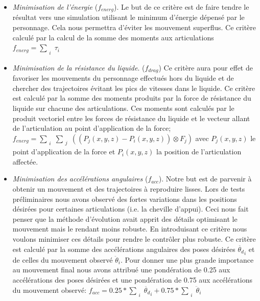 \documentclass[runningheads,a4paper]{llncs}
\begin{document}
\begin{itemize}
\item{\textit{Minimisation de l'énergie} ($f_{energ}$). Le but de ce critère est de faire tendre le résultat vers une simulation utilisant le minimum d'énergie dépensé par le personnage. Cela nous permettra d'éviter les mouvement superflus. Ce critère calculé par la calcul de la somme des moments aux articulations $f_{energ}=\sum_{\substack{i}}{\tau_i}$} 
\item{\textit{Minimisation de la résistance du liquide}. ($f_{drag}$) Ce critère aura pour effet de favoriser les mouvements du personnage effectués hors du liquide et de chercher des trajectoires évitant les pics de vitesses dans le liquide. Ce critère est calculé par la somme des moments produits par la force de résistance du liquide sur chacune des articulations. Ces moments sont calculés par le produit vectoriel entre les forces de résistance du liquide et le vecteur allant de l'articulation au point d'application de la force; $f_{energ}=\sum_{\substack{i}}\sum_{\substack{j}}((P_j(x,y,z)-P_i(x,y,z)) \otimes  F_j)$ avec $P_j(x,y,z)$ le point d'application de la force et $P_i(x,y,z)$ la position de l'articulation affectée.}
\item{\textit{Minimisation des accélérations angulaires} ($f_{acc}$). Notre but est de parvenir à obtenir un mouvement et des trajectoires à reproduire lisses. Lors de tests préliminaires nous avons observé des fortes variations dans les positions désirées pour certaines articulations (i.e. la cheville d'appui). Ceci nous fait penser que la méthode d'évolution avait apprit des détails optimisant le mouvement mais le rendant moins robuste. En introduisant ce critère nous voulons minimiser ces détails pour rendre le contrôler plus robuste. Ce critère est calculé par la somme des accélérations angulaires des poses désirées $\ddot{\theta_d}_i$ et de celles du mouvement observé $\ddot{\theta}_i$.  Pour donner une plus grande importance au mouvement final nous avons attribué une pondération de 0.25 aux accélérations des poses désirées et une pondération de 0.75 aux accélérations du mouvement observé: $f_{acc}=0.25*\sum_{\substack{i}}\ddot{\theta_d}_i+0.75*\sum_{\substack{i}}\ddot{\theta}_i$ }
\end{itemize}
\end{document}
